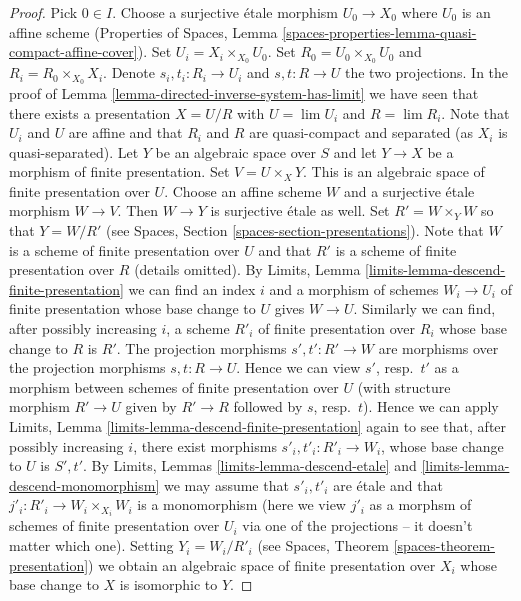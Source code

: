 \begin{proof}
Pick $0 \in I$. Choose a surjective \'etale morphism $U_0 \to X_0$ where
$U_0$ is an affine scheme (Properties of Spaces, Lemma
\ref{spaces-properties-lemma-quasi-compact-affine-cover}).
Set $U_i = X_i \times_{X_0} U_0$. Set $R_0 = U_0 \times_{X_0} U_0$ and
$R_i = R_0 \times_{X_0} X_i$. Denote $s_i, t_i : R_i \to U_i$ and
$s, t : R \to U$ the two projections. In the proof of
Lemma \ref{lemma-directed-inverse-system-has-limit} we have
seen that there exists a presentation $X = U/R$ with
$U = \lim U_i$ and $R = \lim R_i$. Note that $U_i$ and $U$ are affine and
that $R_i$ and $R$ are quasi-compact and separated (as $X_i$ is
quasi-separated). Let $Y$ be an algebraic space over $S$ and let
$Y \to X$ be a morphism of finite presentation. Set $V = U \times_X Y$.
This is an algebraic space of finite presentation over $U$.
Choose an affine scheme $W$ and a surjective \'etale morphism $W \to V$.
Then $W \to Y$ is surjective \'etale as well. Set $R' = W \times_Y W$
so that $Y = W/R'$ (see Spaces, Section \ref{spaces-section-presentations}).
Note that $W$ is a scheme of finite presentation over $U$ and that $R'$
is a scheme of finite presentation over $R$ (details omitted).
By Limits, Lemma \ref{limits-lemma-descend-finite-presentation}
we can find an index $i$ and a morphism of schemes $W_i \to U_i$ of
finite presentation whose base change to $U$ gives $W \to U$. Similarly
we can find, after possibly increasing $i$, a scheme $R'_i$ of finite
presentation over $R_i$ whose base change to $R$ is $R'$.
The projection morphisms $s', t' : R' \to W$ are morphisms over
the projection morphisms $s, t : R \to U$. Hence we can view $s'$,
resp.\ $t'$ as a morphism between schemes of finite presentation over
$U$ (with structure morphism $R' \to U$ given by $R' \to R$ followed
by $s$, resp.\ $t$). Hence we can apply
Limits, Lemma \ref{limits-lemma-descend-finite-presentation}
again to see that, after possibly increasing $i$, there exist
morphisms $s'_i, t'_i : R'_i \to W_i$, whose base change to $U$
is $S', t'$. By Limits, Lemmas \ref{limits-lemma-descend-etale} and
\ref{limits-lemma-descend-monomorphism}
we may assume that $s'_i, t'_i$ are \'etale and that
$j'_i : R'_i \to W_i \times_{X_i} W_i$ is a monomorphism (here we
view $j'_i$ as a morphsm of schemes of finite presentation over $U_i$ via
one of the projections -- it doesn't matter which one). Setting
$Y_i = W_i/R'_i$ (see Spaces, Theorem \ref{spaces-theorem-presentation})
we obtain an algebraic space of finite presentation
over $X_i$ whose base change to $X$ is isomorphic to $Y$.


\end{proof}
